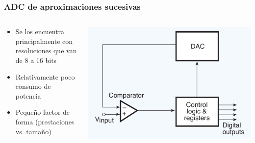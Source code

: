 \documentclass{beamer}
\begin{document}
\begin{frame}
\frametitle{ADC de aproximaciones sucesivas}
  \begin{columns}
    \begin{column}{0.6\textwidth}
        \begin{itemize}
          \item  Se los encuentra principalmente con resoluciones que van de
{\color{blue} 8 a 16 bits}
          \item  Relativamente poco consumo de potencia
          \item  Pequeño factor de forma (prestaciones vs. tamaño)%
        \end{itemize}
    \end{column} 
    \begin{column}{0.4\textwidth}
      \includegraphics[width=\textwidth]{d3/adc_suc_app}
    \end{column}
  \end{columns}
\end{frame}
\end{document}
